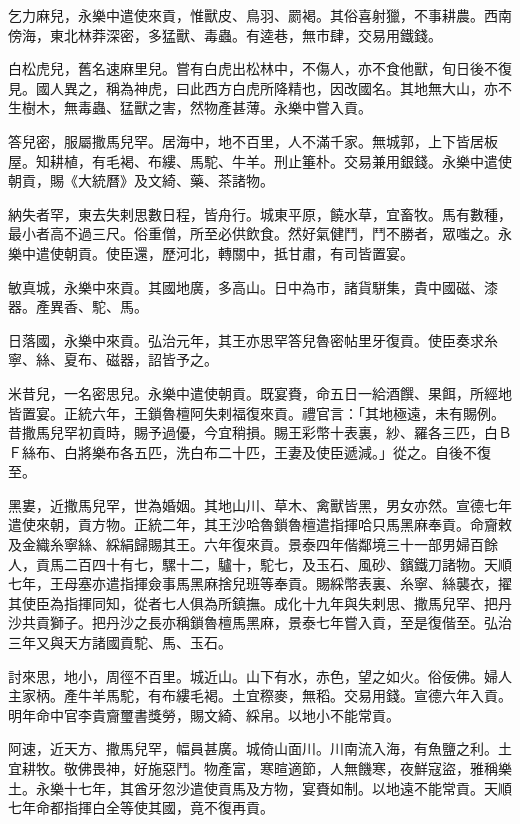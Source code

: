 \begin{pinyinscope}
乞力麻兒，永樂中遣使來貢，惟獸皮、鳥羽、罽褐。其俗喜射獵，不事耕農。西南傍海，東北林莽深密，多猛獸、毒蟲。有逵巷，無市肆，交易用鐵錢。

白松虎兒，舊名速麻里兒。嘗有白虎出松林中，不傷人，亦不食他獸，旬日後不復見。國人異之，稱為神虎，曰此西方白虎所降精也，因改國名。其地無大山，亦不生樹木，無毒蟲、猛獸之害，然物產甚薄。永樂中嘗入貢。

答兒密，服屬撒馬兒罕。居海中，地不百里，人不滿千家。無城郭，上下皆居板屋。知耕植，有毛褐、布縷、馬駝、牛羊。刑止箠朴。交易兼用銀錢。永樂中遣使朝貢，賜《大統曆》及文綺、藥、茶諸物。

納失者罕，東去失剌思數日程，皆舟行。城東平原，饒水草，宜畜牧。馬有數種，最小者高不過三尺。俗重僧，所至必供飲食。然好氣健鬥，鬥不勝者，眾嗤之。永樂中遣使朝貢。使臣還，歷河北，轉關中，抵甘肅，有司皆置宴。

敏真城，永樂中來貢。其國地廣，多高山。日中為市，諸貨駢集，貴中國磁、漆器。產異香、駝、馬。

日落國，永樂中來貢。弘治元年，其王亦思罕答兒魯密帖里牙復貢。使臣奏求糸寧、絲、夏布、磁器，詔皆予之。

米昔兒，一名密思兒。永樂中遣使朝貢。既宴賚，命五日一給酒饌、果餌，所經地皆置宴。正統六年，王鎖魯檀阿失剌福復來貢。禮官言：「其地極遠，未有賜例。昔撒馬兒罕初貢時，賜予過優，今宜稍損。賜王彩幣十表裏，紗、羅各三匹，白ＢＦ絲布、白將樂布各五匹，洗白布二十匹，王妻及使臣遞減。」從之。自後不復至。

黑婁，近撒馬兒罕，世為婚姻。其地山川、草木、禽獸皆黑，男女亦然。宣德七年遣使來朝，貢方物。正統二年，其王沙哈魯鎖魯檀遣指揮哈只馬黑麻奉貢。命齎敕及金織糸寧絲、綵絹歸賜其王。六年復來貢。景泰四年偕鄰境三十一部男婦百餘人，貢馬二百四十有七，騾十二，驢十，駝七，及玉石、風砂、鑌鐵刀諸物。天順七年，王母塞亦遣指揮僉事馬黑麻捨兒班等奉貢。賜綵幣表裏、糸寧、絲襲衣，擢其使臣為指揮同知，從者七人俱為所鎮撫。成化十九年與失剌思、撒馬兒罕、把丹沙共貢獅子。把丹沙之長亦稱鎖魯檀馬黑麻，景泰七年嘗入貢，至是復偕至。弘治三年又與天方諸國貢駝、馬、玉石。

討來思，地小，周徑不百里。城近山。山下有水，赤色，望之如火。俗佞佛。婦人主家柄。產牛羊馬駝，有布縷毛褐。土宜穄麥，無稻。交易用錢。宣德六年入貢。明年命中官李貴齎璽書獎勞，賜文綺、綵帛。以地小不能常貢。

阿速，近天方、撒馬兒罕，幅員甚廣。城倚山面川。川南流入海，有魚鹽之利。土宜耕牧。敬佛畏神，好施惡鬥。物產富，寒暄適節，人無饑寒，夜鮮寇盜，雅稱樂土。永樂十七年，其酋牙忽沙遣使貢馬及方物，宴賚如制。以地遠不能常貢。天順七年命都指揮白全等使其國，竟不復再貢。


\end{pinyinscope}
